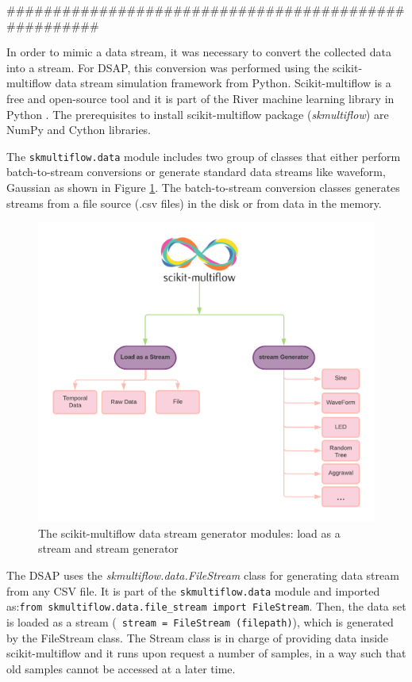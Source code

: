 #####################################################

In order to mimic a data stream, it was necessary to convert the collected data into a stream. For DSAP, this conversion was performed using the scikit-multiflow data stream simulation framework from Python.  Scikit-multiflow is a free and open-source tool and it is part of the River machine learning library in Python \cite{montiel2018scikit}. The prerequisites to install scikit-multiflow package (\textit{skmultiflow}) are NumPy and Cython libraries. 

The \texttt{skmultiflow.data} module includes two group of classes that either perform batch-to-stream conversions or generate standard data streams like waveform, Gaussian as shown in Figure \ref{sci}. The batch-to-stream conversion classes generates streams from a file source (.csv files) in the disk or from data in the memory.

\begin{figure}
    \centering
    \includegraphics[width = 11 cm]{image/Chapters/Chapter5/multiflow.png}
    \caption{The scikit-multiflow data stream generator modules: load as a stream and stream generator}
    \label{sci}
    \end{figure}

The DSAP uses the \textit{skmultiflow.data.FileStream} class for generating data stream from any CSV file. It is part of the \texttt{skmultiflow.data} module and imported as:\texttt{from skmultiflow.data.file\_stream import FileStream}. Then, the data set is loaded as a stream (\texttt{ stream = FileStream (filepath)}), which is generated by the FileStream class. The Stream class is in charge of providing data inside scikit-multiflow and it runs upon request a number of samples, in a way such that old samples cannot be accessed at a later time. 

